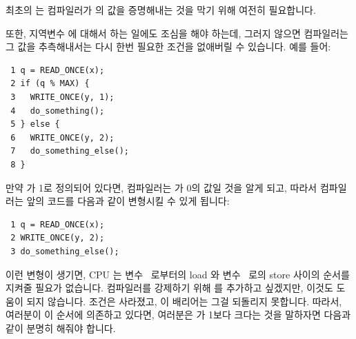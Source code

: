 \begin{enumerate}
최초의  는 컴파일러가  의 값을 증명해내는 것을 막기 위해
여전히 필요합니다.

또한, 지역변수  에 대해서 하는 일에도 조심을 해야 하는데, 그러지 않으면
컴파일러는 그 값을 추측해내서는 다시 한번 필요한 조건을 없애버릴 수 있습니다.
예를 들어:

\vspace{5pt}
\begin{minipage}[t]{\columnwidth}
\scriptsize
\begin{verbatim}
 1 q = READ_ONCE(x);
 2 if (q % MAX) {
 3   WRITE_ONCE(y, 1);
 4   do_something();
 5 } else {
 6   WRITE_ONCE(y, 2);
 7   do_something_else();
 8 }
\end{verbatim}
\end{minipage}
\vspace{5pt}

만약  가 1로 정의되어 있다면, 컴파일러는  가 0의 값일 것을
알게 되고, 따라서 컴파일러는 앞의 코드를 다음과 같이 변형시킬 수 있게 됩니다:

\vspace{5pt}
\begin{minipage}[t]{\columnwidth}
\scriptsize
\begin{verbatim}
 1 q = READ_ONCE(x);
 2 WRITE_ONCE(y, 2);
 3 do_something_else();
\end{verbatim}
\end{minipage}
\vspace{5pt}

이런 변형이 생기면, CPU 는 변수~ 로부터의 load 와 변수~ 로의 store
사이의 순서를 지켜줄 필요가 없습니다.
컴파일러를 강제하기 위해  를 추가하고 싶겠지만, 이것도 도움이
되지 않습니다.
조건은 사라졌고, 이 배리어는 그걸 되돌리지 못합니다.
따라서, 여러분이 이 순서에 의존하고 있다면, 여러분은  가 1보다 크다는
것을 말하자면 다음과 같이 분명히 해줘야 합니다.
\iffalse


\end{enumerate}
